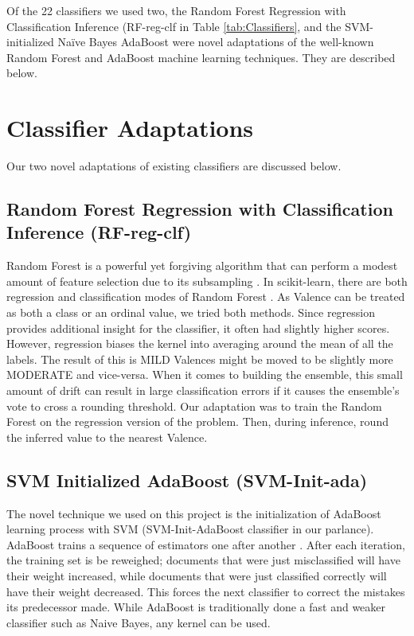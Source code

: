 Of the 22 classifiers we used two, the Random Forest Regression with Classification Inference (\textsf{RF-reg-clf} in Table \ref{tab:Classifiers}, and the SVM-initialized
Na\"{i}ve Bayes AdaBoost were novel adaptations of the well-known
Random Forest \cite{breiman01, ho95} and AdaBoost \cite{adaboost} machine learning
techniques. They are described below.

\section{Classifier Adaptations}\label{sec:newml}

Our two novel adaptations of existing classifiers are discussed below. 

\subsection{Random Forest Regression with Classification Inference (RF-reg-clf)}
Random Forest is a powerful yet forgiving algorithm that can perform a modest amount of feature selection due to its subsampling \cite{breiman01, ho95}. In \textsf{scikit-learn}, there are both regression and classification modes of Random Forest \cite{scikit-learn}. As Valence can be treated as both a class or an ordinal value, we tried both methods. Since regression provides additional insight for the classifier, it often had slightly higher scores. However, regression biases the kernel into averaging around the mean of all the labels. The result of this is \textsf{MILD} Valences might be moved to be slightly more \textsf{MODERATE} and vice-versa. When it comes to building the ensemble, this small amount of drift can result in large classification errors if it causes the ensemble's vote to cross a rounding threshold. Our adaptation was to train the Random Forest on the regression version of the problem. Then, during inference, round the inferred value to the nearest Valence. 

\subsection{SVM Initialized AdaBoost (SVM-Init-ada)}
The novel technique we used on this project is the initialization of AdaBoost learning
process with SVM (\textsf{SVM-Init-AdaBoost} classifier in our parlance). AdaBoost trains
a sequence of  estimators one after another \cite{adaboost}. After each iteration, the training set is be reweighed; documents that were just misclassified will have their weight increased, while documents that were just classified correctly will have their weight decreased. This forces the next classifier to correct the mistakes its predecessor made. While AdaBoost is traditionally done a fast and weaker classifier such as Naive Bayes, any kernel can be used. 


